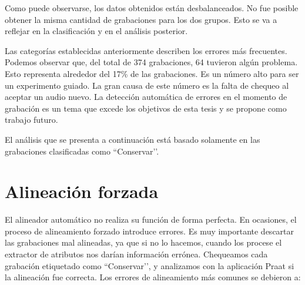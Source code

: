 Como puede observarse, los datos obtenidos están desbalanceados. No fue posible obtener la misma cantidad de grabaciones para los dos grupos. Esto se va a reflejar en la clasificación y en el análisis posterior.

Las categorías establecidas anteriormente describen los errores más frecuentes. Podemos observar que, del total de 374 grabaciones, 64 tuvieron algún problema. Esto representa alrededor del 17\% de las grabaciones. Es un número alto para ser un experimento guiado. La gran causa de este número es la falta de chequeo al aceptar un audio nuevo. La detección automática de errores en el momento de grabación es un tema que excede los objetivos de esta tesis y se propone como trabajo futuro.

El análisis que se presenta a continuación está basado solamente en las grabaciones clasificadas como ``Conservar’’.

\section{Alineación forzada}

El alineador automático no realiza su función de forma perfecta. En ocasiones, el proceso de alineamiento forzado introduce errores. Es muy importante descartar las grabaciones mal alineadas, ya que si no lo hacemos, cuando los procese el extractor de atributos nos darían información errónea. Chequeamos cada grabación etiquetado como ``Conservar’’, y analizamos con la aplicación Praat \cite{praat} si la alineación fue correcta. Los errores de alineamiento más comunes se debieron a:


